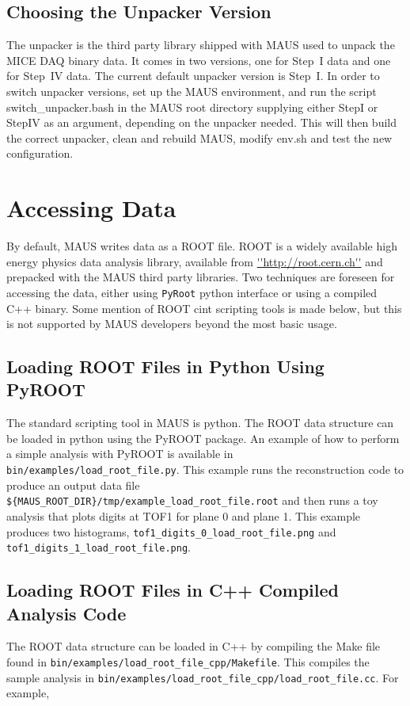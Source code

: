 \subsection{Choosing the Unpacker Version}
The unpacker is the third party library shipped with MAUS used to unpack the MICE DAQ binary data.  It comes in two versions, one for Step~I data and one for Step~IV data.  The current default unpacker version is Step~I.  In order to switch unpacker versions, set up the MAUS environment, and run the script switch\_unpacker.bash in the MAUS root directory supplying either StepI or StepIV as an argument, depending on the unpacker needed. This will then build the correct unpacker, clean and rebuild MAUS, modify env.sh and test the new configuration.

\section{Accessing Data}
By default, MAUS writes data as a ROOT file. ROOT is a widely available high energy physics data analysis library, available from \url{''http://root.cern.ch''} and prepacked with the MAUS third party libraries. Two techniques are foreseen for accessing the data, either using \verb|PyRoot| python interface or using a compiled C++ binary. Some mention of ROOT cint scripting tools is made below, but this is not supported by MAUS developers beyond the most basic usage.

\subsection{Loading ROOT Files in Python Using PyROOT}
The standard scripting tool in MAUS is python. The ROOT data structure can be loaded in python using the PyROOT package. An example of how to perform a simple analysis with PyROOT is available in \verb|bin/examples/load_root_file.py|. This example runs the reconstruction code to produce an output data file \verb|${MAUS_ROOT_DIR}/tmp/example_load_root_file.root| and then runs a toy analysis that plots digits at TOF1 for plane 0 and plane 1. This example produces two histograms, \verb|tof1_digits_0_load_root_file.png| and \verb|tof1_digits_1_load_root_file.png|.

\subsection{Loading ROOT Files in C++ Compiled Analysis Code}
The ROOT data structure can be loaded in C++ by compiling the Make file found in \verb|bin/examples/load_root_file_cpp/Makefile|. This compiles the sample analysis in \verb|bin/examples/load_root_file_cpp/load_root_file.cc|. For example,

